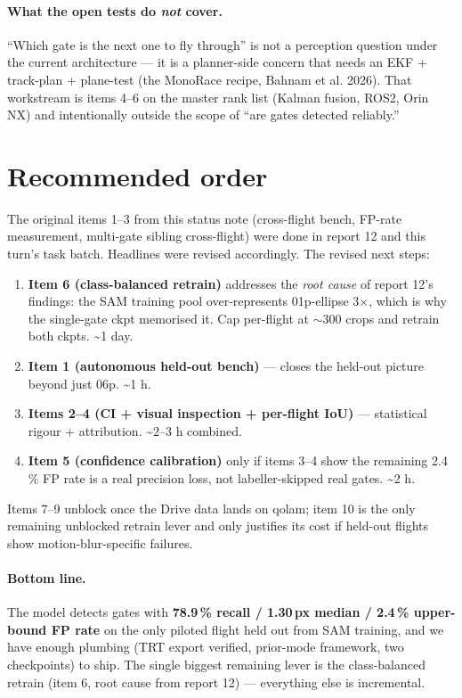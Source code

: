 \documentclass[10pt,a4paper]{article}
\begin{document}
\paragraph{What the open tests do \emph{not} cover.}
``Which gate is the next one to fly through'' is not a perception question
under the current architecture --- it is a planner-side concern that needs
an EKF + track-plan + plane-test (the MonoRace recipe, Bahnam et al. 2026).
That workstream is items 4--6 on the master rank list (Kalman fusion,
ROS2, Orin NX) and intentionally outside the scope of ``are gates
detected reliably.''

\section{Recommended order}

The original items 1--3 from this status note (cross-flight bench,
FP-rate measurement, multi-gate sibling cross-flight) were done in
report 12 and this turn's task batch. Headlines were revised accordingly.
The revised next steps:

\begin{enumerate}
  \item[\textbf{1.}] \textbf{Item 6 (class-balanced retrain)} addresses
        the \emph{root cause} of report 12's findings: the SAM training
        pool over-represents 01p-ellipse 3$\times$, which is why the
        single-gate ckpt memorised it. Cap per-flight at $\sim$300 crops
        and retrain both ckpts. \textasciitilde 1 day.
  \item[\textbf{2.}] \textbf{Item 1 (autonomous held-out bench)} ---
        closes the held-out picture beyond just 06p. \textasciitilde 1 h.
  \item[\textbf{3.}] \textbf{Items 2--4 (CI + visual inspection + per-flight
        IoU)} --- statistical rigour + attribution. \textasciitilde 2--3 h
        combined.
  \item[\textbf{4.}] \textbf{Item 5 (confidence calibration)} only if
        items 3--4 show the remaining 2.4\,\% FP rate is a real precision
        loss, not labeller-skipped real gates. \textasciitilde 2 h.
\end{enumerate}

Items 7--9 unblock once the Drive data lands on qolam; item 10 is the
only remaining unblocked retrain lever and only justifies its cost if
held-out flights show motion-blur-specific failures.

\paragraph{Bottom line.}
The model detects gates with \textbf{78.9\,\% recall / 1.30\,px median /
2.4\,\% upper-bound FP rate} on the only piloted flight held out from
SAM training, and we have enough plumbing (TRT export verified, prior-mode
framework, two checkpoints) to ship. The single biggest remaining lever
is the class-balanced retrain (item 6, root cause from report 12) ---
everything else is incremental.
\end{document}
